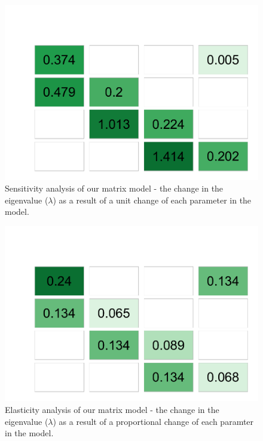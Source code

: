\documentclass[
]{article}
\begin{document}
\begin{figure}
\centering
\includegraphics{Wulfing_CH1_Appendix_files/figure-latex/sensitivity-1.pdf}
\caption{\label{fig:sensitivity}Sensitivity analysis of our matrix model - the change in the eigenvalue (\(\lambda\)) as a result of a unit change of each parameter in the model. \label{sensitivity}}
\end{figure}



\begin{figure}
\centering
\includegraphics{Wulfing_CH1_Appendix_files/figure-latex/elasticity-1.pdf}
\caption{\label{fig:elasticity}Elasticity analysis of our matrix model - the change in the eigenvalue (\(\lambda\)) as a result of a proportional change of each paramter in the model. \label{elasticity}}
\end{figure}
\end{document}
